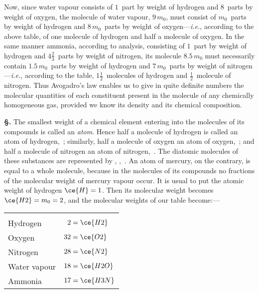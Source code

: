 \documentclass[12pt]{book}[2005/09/16]
\newcommand{\Chg}[2]{#2}
\newcommand{\Add}[1]{\Chg{}{#1}}
\newcommand{\Erratum}[2]{#2}
\newlength{\TmpLen}
\newcommand{\TableFont}{\footnotesize}%
\newcommand{\ColHead}[1]{\multicolumn{1}{c}{#1}}
\newcommand{\Section}[1]{
  \medskip\par\textbf{§\;#1}
  \label{section:#1}
}
\newcommand{\PageSep}[1]{\ignorespaces}
\newcommand{\ie}{\emph{i.e.}}
\newcommand{\Z}{\phantom{0}}
\begin{document}
Now, since water vapour consists of $1$~part by weight of
hydrogen and $8$~parts by weight of oxygen, the molecule
of water vapour, $9\, m_{0}$, must consist of $m_{0}$~parts by weight of
hydrogen and $8\, m_{0}$~parts by weight of oxygen---\ie, according
to the above table, of one molecule of hydrogen and half a
molecule of oxygen. In the same manner ammonia, according
to analysis, consisting of $1$~part by weight of hydrogen
and $4\frac{2}{3}$~parts by weight of nitrogen, its molecule $8.5\, m_{0}$ must
necessarily contain $1.5\, m_{0}$~parts by weight of hydrogen and
$7\, m_{0}$~parts by weight of nitrogen---\ie, according to the
table, $1\frac{1}{2}$~molecules of hydrogen and $\frac{1}{2}$~molecule of nitrogen.
Thus Avogadro's law enables us to give in quite definite
numbers the molecular quantities of each constituent present
in the molecule of any chemically homogeneous gas, provided
we know its density and its chemical composition.

\Section{38.} The smallest weight of a chemical element entering
%
into the molecules of its compounds is called an \emph{atom}.
\PageSep{26}
Hence half a molecule of hydrogen is called an atom of
hydrogen,~; similarly, half a molecule of oxygen an atom
of oxygen,~; and half a molecule of nitrogen an atom
of nitrogen,~. The diatomic molecules of these substances
are represented by , ,~. An atom of mercury, on the
contrary, is equal to a whole molecule, because in the molecules
of its compounds no fractions of the molecular weight
of mercury vapour \Erratum{occurs}{occur}. It is usual to put the atomic
weight of hydrogen $\ce{H} = 1$. Then its molecular weight
becomes $\ce{H2} = m_{0} = 2$, and the molecular weights of our
table become:\Add{---}
\begin{center}
\TableFont
\settowidth{\TmpLen}{Molecular}
\begin{tabular}{l>{\qquad}l}
        & \ColHead{Molecular Weight.} \\
Hydrogen & $\Z2 = \ce{H2}$ \\
Oxygen & $32 = \ce{O2}$ \\
Nitrogen & $28 = \ce{N2}$ \\
Water vapour & $18 = \ce{H2O}$ \\
Ammonia & $17 = \ce{H3N}$ \\
\end{tabular}
\end{center}
\end{document}
